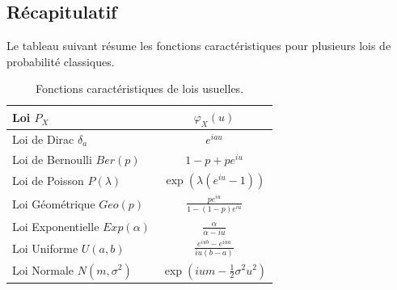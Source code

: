 \subsection{Récapitulatif}
Le tableau suivant résume les fonctions caractéristiques pour plusieurs lois de probabilité classiques.
\begin{table}[H]
\centering
\begin{tabular}{|l|c|}
\hline
\textbf{Loi} $P_X$ & $\varphi_X(u)$ \\
\hline
Loi de Dirac $\delta_a$ & $e^{iau}$ \\
Loi de Bernoulli $Ber(p)$ & $1-p+pe^{iu}$ \\
Loi de Poisson $P(\lambda)$ & $\exp(\lambda(e^{iu}-1))$ \\
Loi Géométrique $Geo(p)$ & $\frac{pe^{iu}}{1-(1-p)e^{iu}}$ \\
Loi Exponentielle $Exp(\alpha)$ & $\frac{\alpha}{\alpha - iu}$ \\
Loi Uniforme $U(a,b)$ & $\frac{e^{iub}-e^{iua}}{iu(b-a)}$ \\
Loi Normale $N(m, \sigma^2)$ & $\exp\left(ium - \frac{1}{2}\sigma^2 u^2\right)$ \\
\hline
\end{tabular}
\caption{Fonctions caractéristiques de lois usuelles.}
\end{table}
